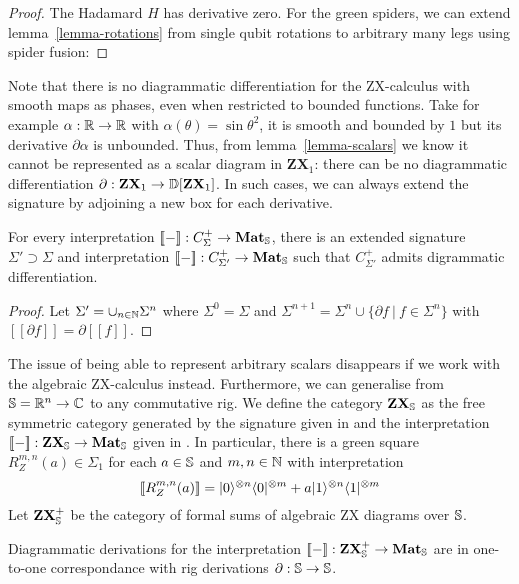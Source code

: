 \begin{proof}
The Hadamard $H$ has derivative zero.
For the green spiders, we can extend lemma~\ref{lemma-rotations} from
single qubit rotations to arbitrary many legs using spider fusion:
\end{proof}

Note that there is no diagrammatic differentiation for the ZX-calculus with
smooth maps as phases, even when restricted to bounded functions.
Take for example $\alpha : \R \to \R$ with $\alpha(\theta) = \sin \theta^2$,
it is smooth and bounded by $1$ but its derivative $\partial \alpha$ is
unbounded.
Thus, from lemma~\ref{lemma-scalars} we know it cannot be represented as a
scalar diagram in $\mathbf{ZX}_1$: there can be no diagrammatic
differentiation $\partial : \mathbf{ZX}_1 \to \D[\mathbf{ZX}_1]$.
In such cases, we can always extend the signature by adjoining a new box
for each derivative.

\begin{proposition}
For every interpretation $[\![-]\!] : C_\Sigma^+ \to \mathbf{Mat}_\S$,
there is an extended signature $\Sigma' \supset \Sigma$
and interpretation $[\![-]\!] : C_{\Sigma'}^+ \to \mathbf{Mat}_\S$
such that $C_{\Sigma'}^+$ admits digrammatic differentiation.
\end{proposition}

\begin{proof}
Let $\Sigma' = \cup_{n \in \N} \Sigma^n$ where $\Sigma^0 = \Sigma$
and $\Sigma^{n + 1} = \Sigma^n \cup \{ \partial f \ \vert \ f \in \Sigma^n \}$
with $[\![\partial f]\!] = \partial [\![f]\!]$.
\end{proof}

The issue of being able to represent arbitrary scalars disappears if we work
with the algebraic ZX-calculus instead. Furthermore, we can generalise
from $\S = \R^n \to \C$ to any commutative rig.
We define the category $\mathbf{ZX}_\S$ as the free symmetric category generated by the signature given in \cite[Table~2]{Wang20} and the interpretation $[\![-]\!] : \mathbf{ZX}_\S \to \mathbf{Mat}_\S$ given in \cite[§6]{Wang20}.
In particular, there is a green square $R_Z^{m, n}(a) \in \Sigma_1$ for each $a \in \S$ and $m, n \in \N$ with interpretation
$$[\![R_Z^{m, n}(a)]\!] = \ket{0}^{\otimes n} \bra{0}^{\otimes m} + a \ket{1}^{\otimes n} \bra{1}^{\otimes m}$$
Let $\mathbf{ZX}_\S^+$ be the category of formal sums of algebraic ZX
diagrams over $\S$.

\begin{theorem}
Diagrammatic derivations for the interpretation $[\![-]\!] : \mathbf{ZX}_\S^+ \to \mathbf{Mat}_\S$
are in one-to-one correspondance with rig derivations $\partial : \S \to \S$.
\end{theorem}

